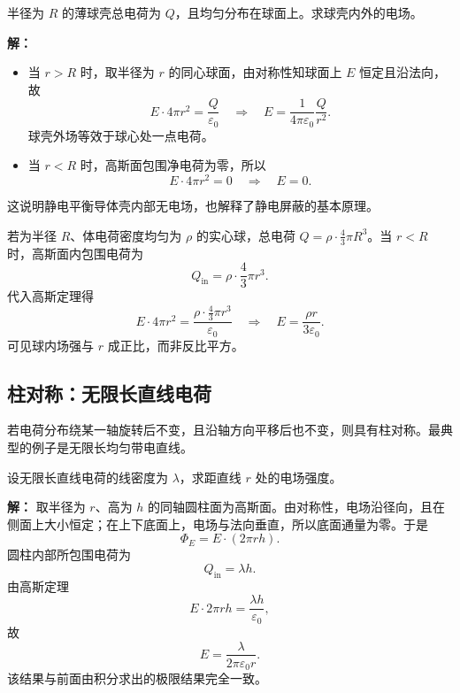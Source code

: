 \begin{example}[均匀带电薄球壳的电场]
半径为 $R$ 的薄球壳总电荷为 $Q$，且均匀分布在球面上。求球壳内外的电场。

\textbf{解：}
\begin{itemize}
  \item 当 $r>R$ 时，取半径为 $r$ 的同心球面，由对称性知球面上 $E$ 恒定且沿法向，故
  \begin{equation}
  E\cdot 4\pi r^2 = \frac{Q}{\varepsilon_0}
  \quad\Rightarrow\quad
  E = \frac{1}{4\pi\varepsilon_0}\frac{Q}{r^2}.
  \end{equation}
  球壳外场等效于球心处一点电荷。
  \item 当 $r<R$ 时，高斯面包围净电荷为零，所以
  \begin{equation}
  E\cdot 4\pi r^2 = 0 \quad\Rightarrow\quad E=0.
  \end{equation}
\end{itemize}
这说明静电平衡导体壳内部无电场，也解释了静电屏蔽的基本原理。
\end{example}

若为半径 $R$、体电荷密度均匀为 $\rho$ 的实心球，总电荷 $Q=\rho\cdot \frac{4}{3}\pi R^3$。当 $r<R$ 时，高斯面内包围电荷为
\begin{equation}
Q_{\text{in}} = \rho\cdot \frac{4}{3}\pi r^3.
\end{equation}
代入高斯定理得
\begin{equation}
E\cdot 4\pi r^2 = \frac{\rho \cdot \frac{4}{3}\pi r^3}{\varepsilon_0}
\quad\Rightarrow\quad
E = \frac{\rho r}{3\varepsilon_0}.
\end{equation}
可见球内场强与 $r$ 成正比，而非反比平方。

\subsection*{柱对称：无限长直线电荷}

若电荷分布绕某一轴旋转后不变，且沿轴方向平移后也不变，则具有柱对称。最典型的例子是无限长均匀带电直线。

\begin{example}[无限长直线电荷的电场]
设无限长直线电荷的线密度为 $\lambda$，求距直线 $r$ 处的电场强度。

\textbf{解：} 取半径为 $r$、高为 $h$ 的同轴圆柱面为高斯面。由对称性，电场沿径向，且在侧面上大小恒定；在上下底面上，电场与法向垂直，所以底面通量为零。于是
\begin{equation}
\Phi_E = E\cdot (2\pi r h).
\end{equation}
圆柱内部所包围电荷为
\begin{equation}
Q_{\text{in}} = \lambda h.
\end{equation}
由高斯定理
\begin{equation}
E\cdot 2\pi r h = \frac{\lambda h}{\varepsilon_0},
\end{equation}
故
\begin{equation}
E = \frac{\lambda}{2\pi\varepsilon_0 r}.
\end{equation}
该结果与前面由积分求出的极限结果完全一致。
\end{example}

